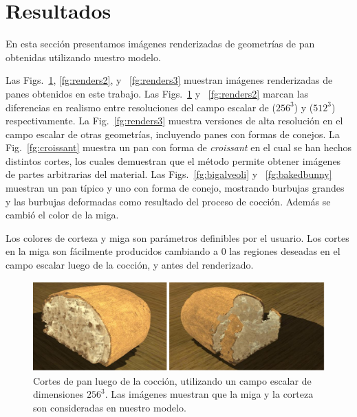 \section{Resultados}
En esta sección presentamos imágenes renderizadas de geometrías de pan obtenidas utilizando nuestro modelo.

Las Figs.~\ref{fg:renders}, \ref{fg:renders2}, y ~\ref{fg:renders3} muestran imágenes renderizadas de panes obtenidos en este trabajo.
Las Figs.~\ref{fg:renders} y ~\ref{fg:renders2} marcan las diferencias en realismo entre resoluciones del campo escalar de ($256^{3}$) y  ($512^{3}$) respectivamente.
La Fig.~\ref{fg:renders3} muestra versiones de alta resolución en el campo escalar de otras geometrías, incluyendo panes con formas de conejos.
La Fig.~\ref{fg:croissant} muestra un pan con forma de {\em croissant} en el cual se han hechos distintos cortes, los cuales demuestran que el método permite obtener imágenes de partes arbitrarias del material.
Las Figs.~\ref{fg:bigalveoli} y ~\ref{fg:bakedbunny} muestran un pan típico y uno con forma de conejo, mostrando burbujas grandes y las burbujas deformadas como resultado del proceso de cocción.
Además se cambió el color de la miga.

Los colores de corteza y miga son parámetros definibles por el usuario. Los cortes en la miga son fácilmente producidos cambiando a $0$ las regiones deseadas en el campo escalar luego de la cocción, y antes del renderizado.

\begin{figure}[!ht]
\begin{center}
\includegraphics[width=13cm]{figures/otherbread}
\caption[Cortes de pan luego de la cocción, utilizando un campo escalar de dimensiones $256^{3}$]{Cortes de pan luego de la cocción, utilizando un campo escalar de dimensiones $256^{3}$. Las imágenes muestran que la miga y la corteza son consideradas en nuestro modelo.}
\label{fg:renders}
\end{center}
\end{figure}

